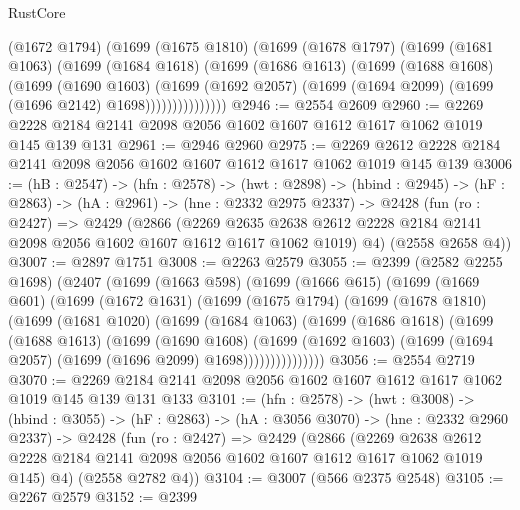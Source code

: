 \begin{lexlean}{RustCore}
\begin{coremodule}
              (@1672 @1794)
              (@1699
                (@1675 @1810)
                (@1699
                  (@1678 @1797)
                  (@1699
                    (@1681 @1063)
                    (@1699
                      (@1684 @1618)
                      (@1699
                        (@1686 @1613)
                        (@1699
                          (@1688 @1608)
                          (@1699
                            (@1690 @1603)
                            (@1699
                              (@1692 @2057)
                              (@1699 (@1694 @2099) (@1699 (@1696 @2142) @1698)))))))))))))))
@2946 := @2554 @2609
@2960 := @2269 @2228 @2184 @2141 @2098 @2056 @1602 @1607 @1612 @1617 @1062 @1019 @145 @139 @131
@2961 := @2946 @2960
@2975 := @2269 @2612 @2228 @2184 @2141 @2098 @2056 @1602 @1607 @1612 @1617 @1062 @1019 @145 @139
@3006 := (hB : @2547) ->
  (hfn : @2578) ->
  (hwt : @2898) ->
  (hbind : @2945) ->
  (hF : @2863) ->
  (hA : @2961) ->
  (hne : @2332 @2975 @2337) ->
  @2428
    (fun (ro : @2427) =>
    @2429
      (@2866
        (@2269 @2635 @2638 @2612 @2228 @2184 @2141 @2098 @2056 @1602 @1607 @1612 @1617 @1062 @1019)
        @4)
      (@2558 @2658 @4))
@3007 := @2897 @1751
@3008 := @2263 @2579
@3055 := @2399
    (@2582 @2255 @1698)
    (@2407
      (@1699
        (@1663 @598)
        (@1699
          (@1666 @615)
          (@1699
            (@1669 @601)
            (@1699
              (@1672 @1631)
              (@1699
                (@1675 @1794)
                (@1699
                  (@1678 @1810)
                  (@1699
                    (@1681 @1020)
                    (@1699
                      (@1684 @1063)
                      (@1699
                        (@1686 @1618)
                        (@1699
                          (@1688 @1613)
                          (@1699
                            (@1690 @1608)
                            (@1699
                              (@1692 @1603)
                              (@1699 (@1694 @2057) (@1699 (@1696 @2099) @1698)))))))))))))))
@3056 := @2554 @2719
@3070 := @2269 @2184 @2141 @2098 @2056 @1602 @1607 @1612 @1617 @1062 @1019 @145 @139 @131 @133
@3101 := (hfn : @2578) ->
  (hwt : @3008) ->
  (hbind : @3055) ->
  (hF : @2863) ->
  (hA : @3056 @3070) ->
  (hne : @2332 @2960 @2337) ->
  @2428
    (fun (ro : @2427) =>
    @2429
      (@2866
        (@2269 @2638 @2612 @2228 @2184 @2141 @2098 @2056 @1602 @1607 @1612 @1617 @1062 @1019 @145)
        @4)
      (@2558 @2782 @4))
@3104 := @3007 (@566 @2375 @2548)
@3105 := @2267 @2579
@3152 := @2399

\end{coremodule}
\end{lexlean}
